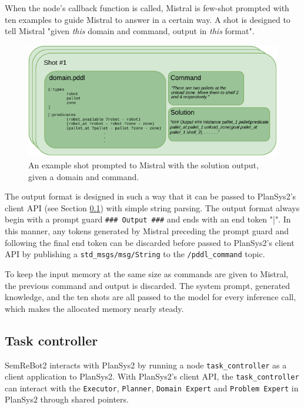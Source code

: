 When the node's callback function is called, Mistral is few-shot prompted with ten examples to guide Mistral to answer in a certain way. A shot is designed to tell Mistral "given \textit{this} domain and command, output in \textit{this} format".

\begin{figure}[ht]
    \centering
    \includegraphics[width=\textwidth]{figures/few-shot_prompting.pdf}
    \caption[Few-shot prompting]{An example shot prompted to Mistral with the solution output, given a domain and command.}
    \label{fig:few_shot_prompt_mistral}
\end{figure}

The output format is designed in such a way that it can be passed to PlanSys2's client API (see Section \ref{ssec:semrebot2_task_controller}) with simple string parsing. The output format always begin with a prompt guard \verb|### Output ###| and ends with an end token "|". In this manner, any tokens generated by Mistral preceding the prompt guard and following the final end token can be discarded before passed to PlanSys2's client API by publishing a \verb|std_msgs/msg/String| to the \verb|/pddl_command| topic.

To keep the input memory at the same size as commands are given to Mistral, the previous command and output is discarded. The system prompt, generated knowledge, and the ten shots are all passed to the model for every inference call, which makes the allocated memory nearly steady.

\subsection{Task controller}\label{ssec:semrebot2_task_controller}
SemReBot2 interacts with PlanSys2 by running a node \verb|task_controller| as a client application to PlanSys2. With PlanSys2's client API, the \verb|task_controller| can interact with the \verb|Executor|, \verb|Planner|, \verb|Domain Expert| and \verb|Problem Expert| in PlanSys2 through shared pointers.

